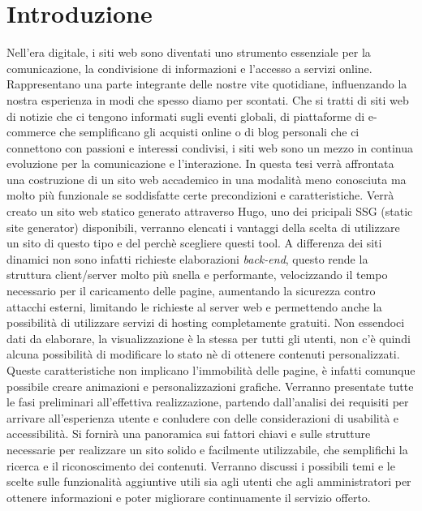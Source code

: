 \documentclass[target=bach,aauheader=]{thud}
\begin{document}
\chapter{Introduzione}
Nell'era digitale, i siti web sono diventati uno strumento essenziale per la comunicazione, la condivisione di informazioni e l'accesso a servizi online. 
Rappresentano una parte integrante delle nostre vite quotidiane, influenzando la nostra esperienza in modi che spesso diamo per scontati. 
Che si tratti di siti web di notizie che ci tengono informati sugli eventi globali, di piattaforme di e-commerce che semplificano gli acquisti online o di blog personali che ci connettono con passioni e interessi condivisi, i siti web sono un mezzo in continua evoluzione per la comunicazione e l'interazione.
\newline \newline
In questa tesi verrà affrontata una costruzione di un sito web accademico in una modalità meno conosciuta ma molto più funzionale se soddisfatte certe precondizioni e caratteristiche. 
Verrà creato un sito web statico generato attraverso Hugo, uno dei pricipali SSG (static site generator) disponibili, verranno elencati i vantaggi della scelta di utilizzare un sito di questo tipo e del perchè scegliere questi tool.  
\newline
A differenza dei siti dinamici non sono infatti richieste elaborazioni \textit{back-end}, questo rende la struttura client/server molto più snella e performante, velocizzando il tempo necessario per il caricamento delle pagine, aumentando la sicurezza contro attacchi esterni, limitando le richieste al server web e permettendo anche la possibilità di utilizzare servizi di hosting completamente gratuiti.     
Non essendoci dati da elaborare, la visualizzazione è la stessa per tutti gli utenti, non c'è quindi alcuna possibilità di modificare lo stato nè di ottenere contenuti personalizzati.  
Queste caratteristiche non implicano l'immobilità delle pagine, è infatti comunque possibile creare animazioni e personalizzazioni grafiche.
\newline \newline
Verranno presentate tutte le fasi preliminari all'effettiva realizzazione, partendo dall'analisi dei requisiti per arrivare all'esperienza utente e conludere con delle considerazioni di usabilità e accessibilità.
Si fornirà una panoramica sui fattori chiavi e sulle strutture necessarie per realizzare un sito solido e facilmente utilizzabile, che semplifichi la ricerca e il riconoscimento dei contenuti. 
Verranno discussi i possibili temi e le scelte sulle funzionalità aggiuntive utili sia agli utenti che agli amministratori per ottenere informazioni e poter migliorare continuamente il servizio offerto.  
\end{document}
